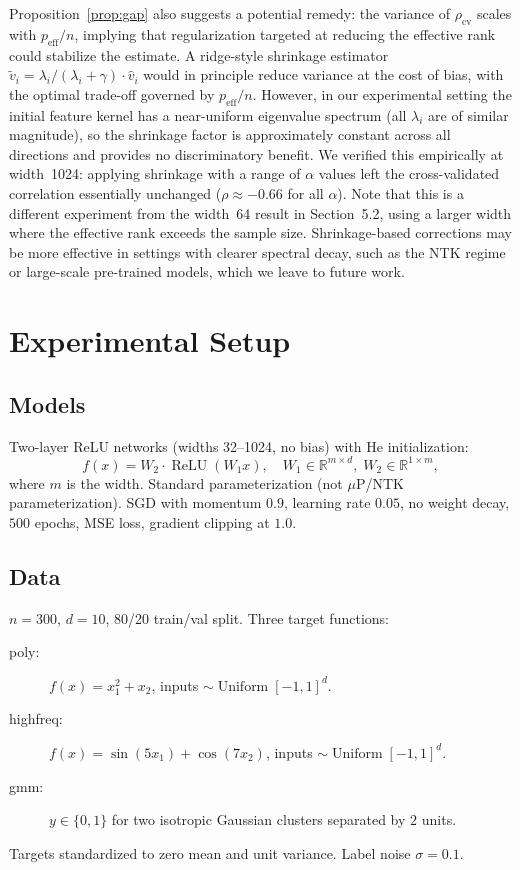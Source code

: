 \documentclass[twoside,11pt]{article}
\begin{document}
Proposition~\ref{prop:gap} also suggests a potential remedy: the variance of $\rho_{\text{cv}}$ scales with $p_{\text{eff}} / n$, implying that regularization targeted at reducing the effective rank could stabilize the estimate.  A ridge-style shrinkage estimator $\tilde{v}_i = \lambda_i / (\lambda_i + \gamma) \cdot \hat{v}_i$ would in principle reduce variance at the cost of bias, with the optimal trade-off governed by $p_{\text{eff}} / n$.  However, in our experimental setting the initial feature kernel has a near-uniform eigenvalue spectrum (all $\lambda_i$ are of similar magnitude), so the shrinkage factor is approximately constant across all directions and provides no discriminatory benefit.  We verified this empirically at width~1024: applying shrinkage with a range of $\alpha$ values left the cross-validated correlation essentially unchanged ($\rho \approx -0.66$ for all $\alpha$). Note that this is a different experiment from the width~64 result in Section~5.2, using a larger width where the effective rank exceeds the sample size.  Shrinkage-based corrections may be more effective in settings with clearer spectral decay, such as the NTK regime or large-scale pre-trained models, which we leave to future work.

\section{Experimental Setup}
\label{sec:setup}

\subsection{Models}
Two-layer ReLU networks (widths 32--1024, no bias) with He initialization:
\[
f(x)=W_{2}\cdot\operatorname{ReLU}(W_{1}x),\quad
W_{1}\in\mathbb{R}^{m\times d},\; W_{2}\in\mathbb{R}^{1\times m},
\]
where $m$ is the width.  Standard parameterization (not $\mu$P/NTK parameterization).  SGD with momentum $0.9$, learning rate $0.05$, no weight decay, $500$ epochs, MSE loss, gradient clipping at $1.0$.

\subsection{Data}
$n=300$, $d=10$, 80/20 train/val split.  Three target functions:
\begin{description}
    \item[poly:] $f(x)=x_{1}^{2}+x_{2}$, inputs $\sim\operatorname{Uniform}[-1,1]^{d}$.
    \item[highfreq:] $f(x)=\sin(5x_{1})+\cos(7x_{2})$, inputs $\sim\operatorname{Uniform}[-1,1]^{d}$.
    \item[gmm:] $y\in\{0,1\}$ for two isotropic Gaussian clusters separated by $2$ units.
\end{description}
Targets standardized to zero mean and unit variance.  Label noise $\sigma=0.1$.
\end{document}
